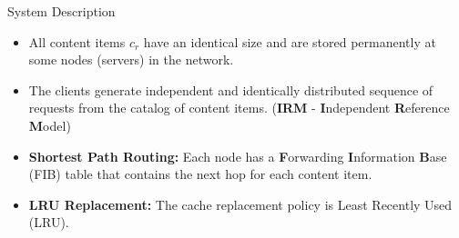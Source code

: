 \documentclass[
	xcolor={svgnames},
	hyperref={pagebackref,bookmarks},
	aspectratio=43,
]{beamer}
\begin{document}
\begin{frame}{System Description}
    \begin{itemize}
        \item All content items $c_r$ have an identical size and are stored permanently at some nodes (servers) in the network.
        \item The clients generate independent and identically distributed sequence of requests from the catalog of content items. (\textbf{IRM} - \textbf{I}ndependent \textbf{R}eference \textbf{M}odel) \footnotemark
        \item \textbf{Shortest Path Routing:} Each node has a \textbf{F}orwarding \textbf{I}nformation \textbf{B}ase (FIB) table that contains the next hop for each content item.
        \item \textbf{LRU Replacement:} The cache replacement policy is Least Recently Used (LRU).
    \end{itemize}
\end{frame}
\end{document}

